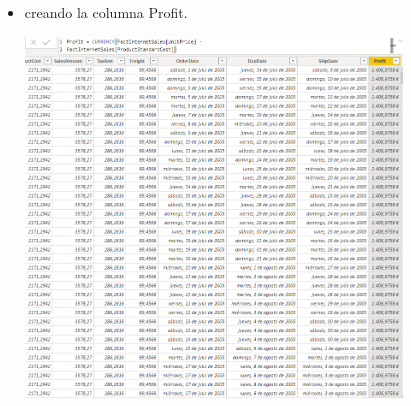 \begin{itemize}
	\item creando la columna Profit.
	\begin{center}
	\includegraphics[width=10cm]{./Imagenes/Captura3-6} 
	\end{center}
\end{itemize}








